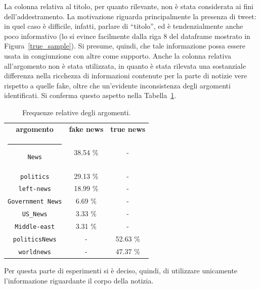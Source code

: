 \documentclass[12pt]{report}
\makeatletter
\theoremstyle{definition}
\newcommand{\thickhline}{%
    \noalign {\ifnum 0=`}\fi \hrule height 1pt
    \futurelet \reserved@a \@xhline
}
\makeatother
\begin{document}
La colonna relativa al titolo, per quanto rilevante, non è stata considerata ai fini dell'addestramento. La motivazione riguarda principalmente la presenza di tweet: in quel caso è difficile, infatti, parlare di ``titolo'', ed è tendenzialmente anche poco informativo (lo si evince facilmente dalla riga 8 del dataframe mostrato in Figura~\ref{true_sample}). Si presume, quindi, che tale informazione possa essere usata in congiunzione con altre come supporto.
Anche la colonna relativa all'argomento non è stata utilizzata, in quanto è stata rilevata una sostanziale differenza nella ricchezza di informazioni contenute per la parte di notizie vere rispetto a quelle fake, oltre che un'evidente inconsistenza degli argomenti identificati. Si conferma questo aspetto nella Tabella~\ref{subject}.
\begin{table}
\centering
 \begin{tabular}{|c|c|c|} 
 \hline 
 \textbf{argomento} & \textbf{fake news} & \textbf{true news}
\\ [0.5ex] 
 \thickhline
\texttt{News} & 38.54 \% & - \\
\texttt{politics} & 29.13 \% & -\\ 
\texttt{left-news} & 18.99 \% & -\\
\texttt{Government News} & 6.69 \% & -\\
\texttt{US\_News} & 3.33 \% & -\\
\texttt{Middle-east} & 3.31 \% & -\\
\texttt{politicsNews} & - & 52.63 \% \\
\texttt{worldnews} & - & 47.37 \% \\
 \hline
\end{tabular}
\caption{Frequenze relative degli argomenti.}
\label{subject}
\end{table}
Per questa parte di esperimenti si è deciso, quindi, di utilizzare unicamente l'informazione riguardante il corpo della notizia. 
\end{document}
